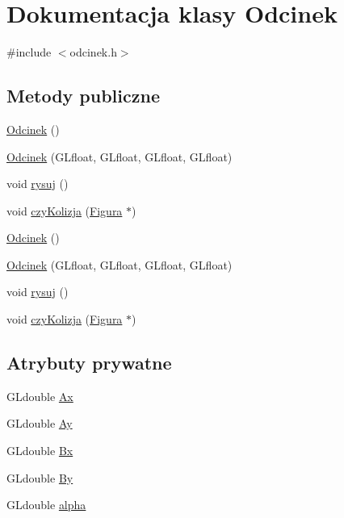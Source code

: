 \hypertarget{classOdcinek}{\section{Dokumentacja klasy Odcinek}
\label{classOdcinek}
}


{\ttfamily \#include $<$odcinek.\-h$>$}

\subsection*{Metody publiczne}
\begin{DoxyCompactItemize}
\item 
\hyperlink{classOdcinek_a61af08a0eaeb8456229ea13c711308dd}{Odcinek} ()
\item 
\hyperlink{classOdcinek_a4dbf14298ec288b21847145a42ee4d9b}{Odcinek} (G\-Lfloat, G\-Lfloat, G\-Lfloat, G\-Lfloat)
\item 
void \hyperlink{classOdcinek_ac7e1b01901141cdb9d9be315d39e0ff3}{rysuj} ()
\item 
void \hyperlink{classOdcinek_ab04f490d2d299534a64cb764da265acc}{czy\-Kolizja} (\hyperlink{classFigura}{Figura} $\ast$)
\item 
\hyperlink{classOdcinek_a61af08a0eaeb8456229ea13c711308dd}{Odcinek} ()
\item 
\hyperlink{classOdcinek_a4dbf14298ec288b21847145a42ee4d9b}{Odcinek} (G\-Lfloat, G\-Lfloat, G\-Lfloat, G\-Lfloat)
\item 
void \hyperlink{classOdcinek_ac7e1b01901141cdb9d9be315d39e0ff3}{rysuj} ()
\item 
void \hyperlink{classOdcinek_ab04f490d2d299534a64cb764da265acc}{czy\-Kolizja} (\hyperlink{classFigura}{Figura} $\ast$)
\end{DoxyCompactItemize}
\subsection*{Atrybuty prywatne}
\begin{DoxyCompactItemize}
\item 
G\-Ldouble \hyperlink{classOdcinek_a39b3b1acd7db3f6dc056e359d3db5b75}{Ax}
\item 
G\-Ldouble \hyperlink{classOdcinek_ab2cd69558f00cd9b15e2309c5901b593}{Ay}
\item 
G\-Ldouble \hyperlink{classOdcinek_ae133a5bdfe251589ac5aa7d3b55ff0c7}{Bx}
\item 
G\-Ldouble \hyperlink{classOdcinek_a7be85a14be406b60a4a568dba20acd95}{By}
\item 
G\-Ldouble \hyperlink{classOdcinek_afa62a8621db4414224de6ca68c80f91b}{alpha}
\end{DoxyCompactItemize}
